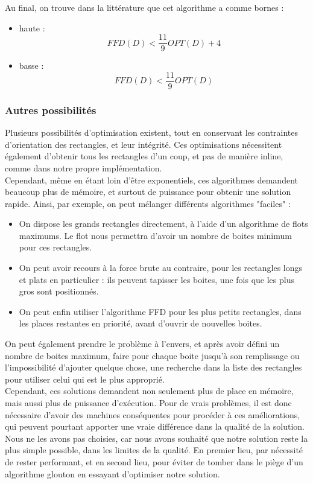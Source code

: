 \documentclass[12pt]{article}
\begin{document}
Au final, on trouve dans la littérature que cet algorithme a comme bornes : 
\begin{itemize}
\item haute : 
\[ FFD(D) < \frac{11}{9}OPT(D) + 4 \]
\item basse : 
\[ FFD(D) < \frac{11}{9}OPT(D) \]
\end{itemize}


\subsubsection*{Autres possibilités}
Plusieurs possibilités d'optimisation existent, tout en conservant les contraintes d'orientation des rectangles, et leur intégrité. Ces optimisations nécessitent également d'obtenir tous les rectangles d'un coup, et pas de manière inline, comme dans notre propre implémentation. \\
Cependant, même en étant loin d'être exponentiels, ces algorithmes demandent beaucoup plus de mémoire, et surtout de puissance pour obtenir une solution rapide. 
Ainsi, par exemple, on peut mélanger différents algorithmes "faciles" :\\
\begin{itemize}
\item On dispose les grands rectangles directement, à l'aide d'un algorithme de flots maximums. Le flot nous permettra d'avoir un nombre de boites minimum pour ces rectangles. 
\item On peut avoir recours à la force brute au contraire, pour les rectangles longs et plats en particulier : ils peuvent tapisser les boites, une fois que les plus gros sont positionnés. 
\item On peut enfin utiliser l'algorithme FFD pour les plus petits rectangles, dans les places restantes en priorité, avant d'ouvrir de nouvelles boites. 
\end{itemize}
On peut également prendre le problème à l'envers, et après avoir défini un nombre de boites maximum, faire pour chaque boite jusqu'à son remplissage ou l'impossibilité d'ajouter quelque chose, une recherche dans la liste des rectangles pour utiliser celui qui est le plus approprié. \\


Cependant, ces solutions demandent non seulement plus de place en mémoire, mais aussi plus de puissance d'exécution. Pour de vrais problèmes, il est donc nécessaire d'avoir des machines conséquentes pour procéder à ces améliorations, qui peuvent pourtant apporter une vraie différence dans la qualité de la solution. 
Nous ne les avons pas choisies, car nous avons souhaité que notre solution reste la plus simple possible, dans les limites de la qualité. En premier lieu, par nécessité de rester performant, et en second lieu, pour éviter de tomber dans le piège d'un algorithme glouton en  essayant d'optimiser notre solution.  
\end{document}
